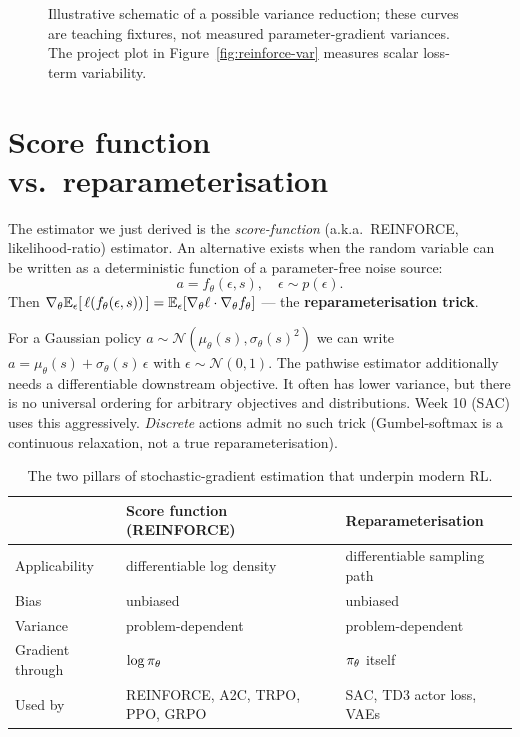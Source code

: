 \documentclass[11pt,oneside]{scrbook}
\begin{document}
\begin{figure}[h]
\centering
{}
\caption{Illustrative schematic of a possible variance reduction; these curves are teaching fixtures, not measured parameter-gradient variances. The project plot in Figure~\ref{fig:reinforce-var} measures scalar loss-term variability.}
\end{figure}

\section{Score function vs.\ reparameterisation}

The estimator we just derived is the \emph{score-function} (a.k.a.\ REINFORCE, likelihood-ratio) estimator. An alternative exists when the random variable can be written as a deterministic function of a parameter-free noise source:
\[
  a = f_\theta(\epsilon, s), \quad \epsilon \sim p(\epsilon).
\]
Then $\nabla_\theta \mathbb{E}_\epsilon[\,\ell(f_\theta(\epsilon,s))\,] = \mathbb{E}_\epsilon[\nabla_\theta \ell \cdot \nabla_\theta f_\theta]$ --- the \textbf{reparameterisation trick}.

\begin{remark}
For a Gaussian policy $a \sim \mathcal{N}(\mu_\theta(s), \sigma_\theta(s)^2)$ we can write $a = \mu_\theta(s) + \sigma_\theta(s)\, \epsilon$ with $\epsilon \sim \mathcal{N}(0,1)$. The pathwise estimator additionally needs a differentiable downstream
objective. It often has lower variance, but there is no universal ordering
for arbitrary objectives and distributions. Week 10 (SAC) uses this aggressively. \emph{Discrete} actions admit no such trick (Gumbel-softmax is a continuous relaxation, not a true reparameterisation).
\end{remark}

\begin{table}[h]
\centering\small
\begin{tabular}{lll}\toprule
 & Score function (REINFORCE) & Reparameterisation \\ \midrule
Applicability & differentiable log density & differentiable sampling path \\
Bias & unbiased & unbiased \\
Variance & problem-dependent & problem-dependent \\
Gradient through & $\log \pi_\theta$ & $\pi_\theta$ itself \\
Used by & REINFORCE, A2C, TRPO, PPO, GRPO & SAC, TD3 actor loss, VAEs \\ \bottomrule
\end{tabular}
\caption{The two pillars of stochastic-gradient estimation that underpin modern RL.}
\end{table}
\end{document}
